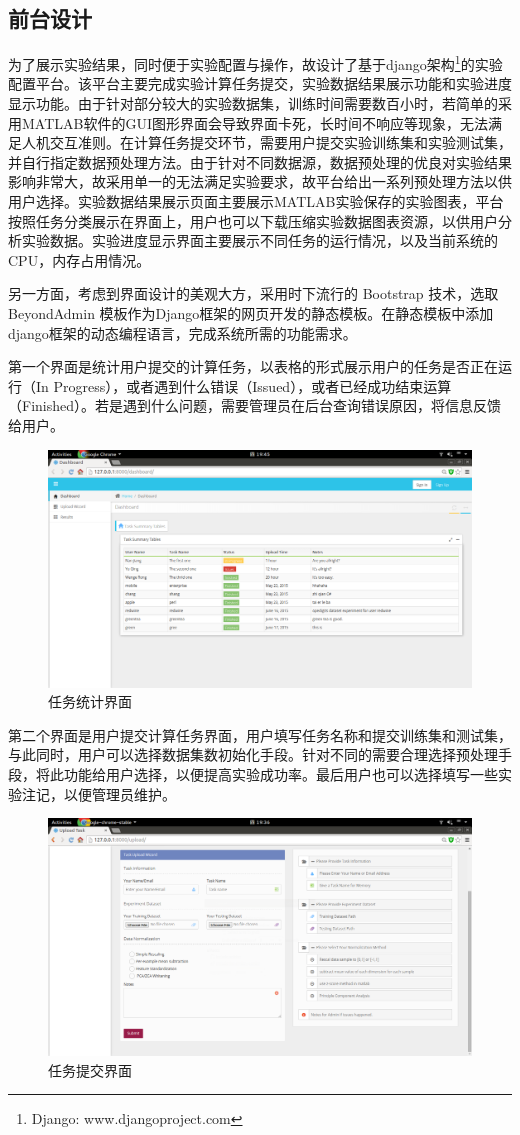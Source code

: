 \documentclass[oneside]{ZJUthesis}
\begin{document}
\subsection{前台设计}
为了展示实验结果，同时便于实验配置与操作，故设计了基于django架构\footnote{Django: www.djangoproject.com}的实验配置平台。该平台主要完成实验计算任务提交，实验数据结果展示功能和实验进度显示功能。由于针对部分较大的实验数据集，训练时间需要数百小时，若简单的采用MATLAB软件的GUI图形界面会导致界面卡死，长时间不响应等现象，无法满足人机交互准则。在计算任务提交环节，需要用户提交实验训练集和实验测试集，并自行指定数据预处理方法。由于针对不同数据源，数据预处理的优良对实验结果影响非常大，故采用单一的无法满足实验要求，故平台给出一系列预处理方法以供用户选择。实验数据结果展示页面主要展示MATLAB实验保存的实验图表，平台按照任务分类展示在界面上，用户也可以下载压缩实验数据图表资源，以供用户分析实验数据。实验进度显示界面主要展示不同任务的运行情况，以及当前系统的CPU，内存占用情况。

另一方面，考虑到界面设计的美观大方，采用时下流行的 Bootstrap 技术，选取 BeyondAdmin 模板作为Django框架的网页开发的静态模板。在静态模板中添加django框架的动态编程语言，完成系统所需的功能需求。

第一个界面是统计用户提交的计算任务，以表格的形式展示用户的任务是否正在运行（In Progress），或者遇到什么错误（Issued），或者已经成功结束运算（Finished）。若是遇到什么问题，需要管理员在后台查询错误原因，将信息反馈给用户。
\begin{figure}[H]
\centering
\includegraphics[width=0.7\linewidth]{./Pictures/django01.png}
\caption{任务统计界面\label{fig:framework}}
\end{figure}

第二个界面是用户提交计算任务界面，用户填写任务名称和提交训练集和测试集，与此同时，用户可以选择数据集数初始化手段。针对不同的需要合理选择预处理手段，将此功能给用户选择，以便提高实验成功率。最后用户也可以选择填写一些实验注记，以便管理员维护。
\begin{figure}[H]
\centering
\includegraphics[width=0.7\linewidth]{./Pictures/django02.png}
\caption{任务提交界面\label{fig:framework}}
\end{figure}
\end{document}
